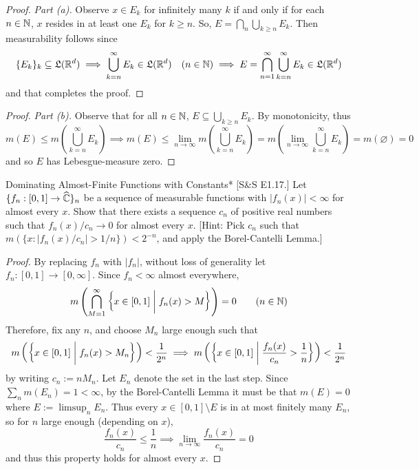 \begin{proof}
    \textit{Part (a).} Observe \(x \in E_k\) for infinitely many \(k\) if and only if for each \(n \in \mathbb{N}\), \(x\) resides in at least one \(E_k\) for \(k \geq n\). So, \(E = \bigcap_n \bigcup_{k \geq n} E_k\). Then measurability follows since 
    \[
    \{E_k\}_k \subseteq \mathfrak{L}(\mathbb{R}^d)
    \implies \bigcup_{k = n}^\infty E_k \in \mathfrak{L}(\mathbb{R}^d) \quad (n \in \mathbb{N})
    \implies E = \bigcap_{n=1}^\infty \bigcup_{k = n}^\infty E_k \in \mathfrak{L}(\mathbb{R}^d)
    \]
    and that completes the proof.
\end{proof}

\begin{proof}
    \textit{Part (b).} Observe that for all \(n \in \mathbb{N}\), \(E \subseteq \bigcup_{k \geq n} E_k\). By monotonicity, thus 
    \[
        m(E) 
        \leq m \left( \bigcup_{k = n}^\infty E_k \right)
        \implies 
        m(E) 
        \leq \lim_{n \to \infty} m\left(\bigcup_{k = n}^\infty E_k \right) 
        = m\left(\lim_{n \to \infty} \bigcup_{k = n}^\infty E_k \right) 
        = m(\varnothing) 
        = 0
    \]
    and so \(E\) has Lebesgue-measure zero. 
\end{proof}

\begin{problem}{Dominating Almost-Finite Functions with Constants}*
    [S\&S E1.17.] Let \(\{f_n : [0, 1] \to \widehat{\mathbb{C}}\}_n\) be a sequence of measurable functions with \(|f_n(x)|<\infty\) for almost every \(x\). Show that there exists a sequence \(c_n\) of positive real numbers such that \(f_n(x) / c_n \to 0\) for almost every \(x\). [Hint: Pick \(c_n\) such that \(m(\{x : |f_n(x) / c_n| > 1/n\}) < 2^{-n}\), and apply the Borel-Cantelli Lemma.]
\end{problem}

\begin{proof}
    By replacing \(f_n\) with \(|f_n|\), without loss of generality let \(f_n : [0,1] \to [0, \infty]\). Since \(f_n < \infty\) almost everywhere, 
    \[
    m\left( \bigcap_{M = 1}^\infty \left\{ x \in [0, 1] \;\biggr\rvert\; f_n(x) > M \right\} \right) = 0
    \qquad (n \in \mathbb{N})
    \]
    Therefore, fix any \(n\), and choose \(M_n\) large enough such that 
    \[
    m\left( \left\{ x \in [0, 1] \;\biggr\rvert\; f_n(x) > M_n \right\} \right) < \frac{1}{2^n}
    \implies 
    m\left( \left\{ x \in [0, 1] \;\biggr\rvert\; \frac{f_n(x)}{c_n} > \frac{1}{n} \right\} \right) < \frac{1}{2^n}
    \]
    by writing \(c_n := nM_n\). Let \(E_n\) denote the set in the last step. Since \(\sum_{n} m(E_n) = 1 < \infty\), by the Borel-Cantelli Lemma it must be that \(m(E) = 0\) where \(E := \limsup_n E_n\). Thus every \(x \in [0, 1] \setminus E\) is in at most finitely many \(E_n\), so for \(n\) large enough (depending on \(x\)), 
    \[
    \frac{f_n(x)}{c_n} \leq \frac{1}{n} \implies \lim_{n \to \infty} \frac{f_n(x)}{c_n} = 0
    \]
    and thus this property holds for almost every \(x\). 
\end{proof}

